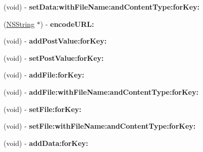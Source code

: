 \begin{DoxyCompactItemize}
\item 
\hypertarget{interface_a_s_i_form_data_request_abbcca0f83bbe93f0132094a99a274098}{
(void) -\/ {\bfseries set\-Data\-:with\-File\-Name\-:and\-Content\-Type\-:for\-Key\-:}}
\label{interface_a_s_i_form_data_request_abbcca0f83bbe93f0132094a99a274098}

\item 
\hypertarget{interface_a_s_i_form_data_request_ab8c6677cbdb0cd4bf7660b79e5afa334}{
(\hyperlink{class_n_s_string}{\-N\-S\-String} $\ast$) -\/ {\bfseries encode\-U\-R\-L\-:}}
\label{interface_a_s_i_form_data_request_ab8c6677cbdb0cd4bf7660b79e5afa334}

\item 
\hypertarget{interface_a_s_i_form_data_request_af9571a143a9feeb009c33c458447aa98}{
(void) -\/ {\bfseries add\-Post\-Value\-:for\-Key\-:}}
\label{interface_a_s_i_form_data_request_af9571a143a9feeb009c33c458447aa98}

\item 
\hypertarget{interface_a_s_i_form_data_request_a90236e7099afbab72bb160029df5a368}{
(void) -\/ {\bfseries set\-Post\-Value\-:for\-Key\-:}}
\label{interface_a_s_i_form_data_request_a90236e7099afbab72bb160029df5a368}

\item 
\hypertarget{interface_a_s_i_form_data_request_afa340cd3b263a621a4f52015cdb8c568}{
(void) -\/ {\bfseries add\-File\-:for\-Key\-:}}
\label{interface_a_s_i_form_data_request_afa340cd3b263a621a4f52015cdb8c568}

\item 
\hypertarget{interface_a_s_i_form_data_request_ae413f676daaf869aa3cac76371466c16}{
(void) -\/ {\bfseries add\-File\-:with\-File\-Name\-:and\-Content\-Type\-:for\-Key\-:}}
\label{interface_a_s_i_form_data_request_ae413f676daaf869aa3cac76371466c16}

\item 
\hypertarget{interface_a_s_i_form_data_request_a8b097474a664290880231fd4439f352e}{
(void) -\/ {\bfseries set\-File\-:for\-Key\-:}}
\label{interface_a_s_i_form_data_request_a8b097474a664290880231fd4439f352e}

\item 
\hypertarget{interface_a_s_i_form_data_request_a1b319de7b302e41e0f2b62b04efd4976}{
(void) -\/ {\bfseries set\-File\-:with\-File\-Name\-:and\-Content\-Type\-:for\-Key\-:}}
\label{interface_a_s_i_form_data_request_a1b319de7b302e41e0f2b62b04efd4976}

\item 
\hypertarget{interface_a_s_i_form_data_request_abeb27ef3dc358d5e0a27ba3a077a6653}{
(void) -\/ {\bfseries add\-Data\-:for\-Key\-:}}
\label{interface_a_s_i_form_data_request_abeb27ef3dc358d5e0a27ba3a077a6653}


\end{DoxyCompactItemize}
